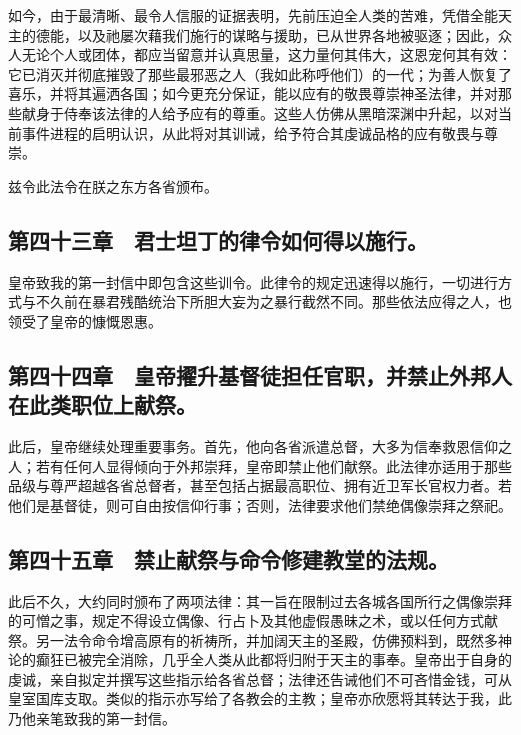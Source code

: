 如今，由于最清晰、最令人信服的证据表明，先前压迫全人类的苦难，凭借全能天主的德能，以及祂屡次藉我们施行的谋略与援助，已从世界各地被驱逐；因此，众人无论个人或团体，都应当留意并认真思量，这力量何其伟大，这恩宠何其有效：它已消灭并彻底摧毁了那些最邪恶之人（我如此称呼他们）的一代；为善人恢复了喜乐，并将其遍洒各国；如今更充分保证，能以应有的敬畏尊崇神圣法律，并对那些献身于侍奉该法律的人给予应有的尊重。这些人仿佛从黑暗深渊中升起，以对当前事件进程的启明认识，从此将对其训诫，给予符合其虔诚品格的应有敬畏与尊崇。\par

兹令此法令在朕之东方各省颁布。\par


\subsection{第四十三章　君士坦丁的律令如何得以施行。}

皇帝致我的第一封信中即包含这些训令。此律令的规定迅速得以施行，一切进行方式与不久前在暴君残酷统治下所胆大妄为之暴行截然不同。那些依法应得之人，也领受了皇帝的慷慨恩惠。\par


\subsection{第四十四章　皇帝擢升基督徒担任官职，并禁止外邦人在此类职位上献祭。}

此后，皇帝继续处理重要事务。首先，他向各省派遣总督，大多为信奉救恩信仰之人；若有任何人显得倾向于外邦崇拜，皇帝即禁止他们献祭。此法律亦适用于那些品级与尊严超越各省总督者，甚至包括占据最高职位、拥有近卫军长官权力者。若他们是基督徒，则可自由按信仰行事；否则，法律要求他们禁绝偶像崇拜之祭祀。\par


\subsection{第四十五章　禁止献祭与命令修建教堂的法规。}

此后不久，大约同时颁布了两项法律：其一旨在限制过去各城各国所行之偶像崇拜的可憎之事，规定不得设立偶像、行占卜及其他虚假愚昧之术，或以任何方式献祭。另一法令命令增高原有的祈祷所，并加阔天主的圣殿，仿佛预料到，既然多神论的癫狂已被完全消除，几乎全人类从此都将归附于天主的事奉。皇帝出于自身的虔诚，亲自拟定并撰写这些指示给各省总督；法律还告诫他们不可吝惜金钱，可从皇室国库支取。类似的指示亦写给了各教会的主教；皇帝亦欣愿将其转达于我，此乃他亲笔致我的第一封信。\par

